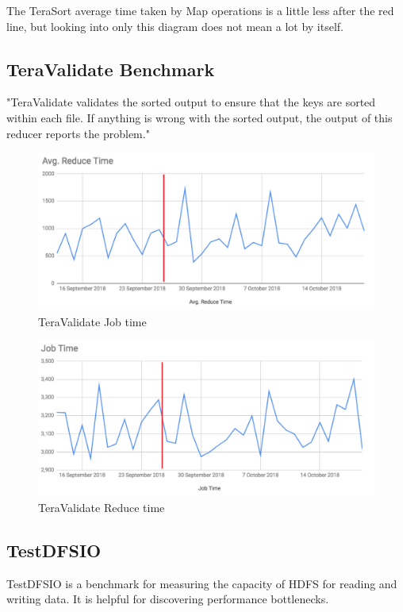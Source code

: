 The TeraSort average time taken by Map operations is a little less after the red line, but looking into only this diagram does not mean a lot by itself.

\subsection{TeraValidate Benchmark}
"TeraValidate validates the sorted output to ensure that the keys are sorted within each file. If anything is wrong with the sorted output, the output of this reducer reports the problem." \cite{terasort}

\begin{figure}[H]
	\includegraphics[width=125mm, keepaspectratio]{figures/teravalidate_job.png}
	\centering
	\caption{TeraValidate Job time}
\end{figure}
\begin{figure}[H]
	\includegraphics[width=125mm, keepaspectratio]{figures/teravalidate_reduce.png}
	\centering
	\caption{TeraValidate Reduce time}
\end{figure}

\subsection{TestDFSIO}
TestDFSIO is a benchmark for measuring the capacity of HDFS for reading and writing data. It is helpful for discovering performance bottlenecks.

